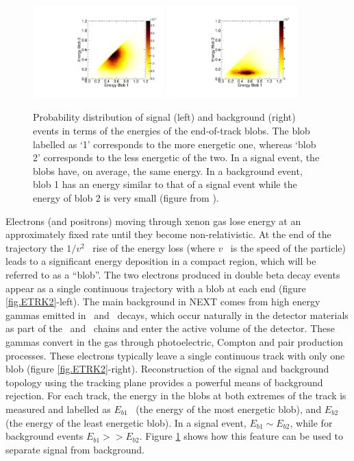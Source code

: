 \documentclass[a4paper,11pt]{article}
\begin{document}
\begin{figure}[!htb]
\centering
\includegraphics[width=0.45\textwidth]{fig/EnergyBlobsSignal.pdf}
\includegraphics[width=0.45\textwidth]{fig/EnergyBlobsTl208.pdf}
\caption{Probability distribution of signal (left) and background (right) events in terms of the energies of the end-of-track blobs. The blob labelled as `1' corresponds to the more energetic one, whereas `blob 2' corresponds to the less energetic of the two. In a signal event, the blobs have, on average, the same energy. In a background event, blob 1 has an energy similar to that of a signal event while the energy of blob 2 is very small (figure from \cite{MartinAlbo_thesis}).} \label{fig.BLOBS}
\end{figure}

Electrons (and positrons) moving through xenon gas lose energy at an approximately fixed rate until they become non-relativistic. At the end of the trajectory the $1/v^2$~ rise of the energy loss (where $v$~ is the speed of the particle) leads to a significant energy deposition in a compact region, which will be referred to as a ``blob''. The two electrons produced in double beta decay events appear as a single continuous trajectory with a blob at each end (figure \ref{fig.ETRK2}-left). The main background in NEXT comes from high energy gammas emitted in \TL\ and \BI\ decays, which occur naturally in the detector materials as part of the \THT\ and \UTT\ chains and enter the active volume of the detector. These gammas convert in the gas through photoelectric, Compton and pair production processes. These electrons typically leave a single continuous track with only one blob (figure \ref{fig.ETRK2}-right). 
Reconstruction of the signal and background topology using the tracking plane provides a powerful means of background rejection. For each track, the energy in the blobs at both extremes of the track is measured and labelled as $E_{b1}$~ (the energy of the most energetic blob), and $E_{b2}$~ (the energy of the least energetic blob). In a signal event, $E_{b1} \sim E_{b2} $, while for background events $E_{b1} >> E_{b2} $. Figure \ref{fig.BLOBS} shows how this feature can be used to separate signal from background. 
\end{document}
